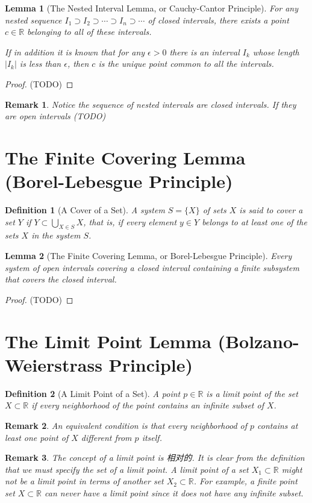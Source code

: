 \documentclass[onecolumn]{ctexart}
\newtheorem{definition}{Definition}
\newtheorem{lemma}{Lemma}
\newtheorem{remark}{Remark}
\begin{document}
\begin{lemma}[The Nested Interval Lemma, or Cauchy-Cantor Principle]
  For any nested sequence $I_1 \supset I_2 \supset \cdots \supset I_n \supset 
  \cdots$ of closed intervals, there exists a point $c \in \mathbb{R}$ belonging 
  to all of these intervals.

  If in addition it is known that for any $\epsilon > 0$ there is an interval 
  $I_k$ whose length $|I_k|$ is less than $\epsilon$, then $c$ is the unique 
  point common to all the intervals.
\end{lemma}
\begin{proof}
  (TODO)
\end{proof}
\begin{remark}
  Notice the sequence of nested intervals are closed intervals. If they are open 
  intervals (TODO)
\end{remark}

\section{The Finite Covering Lemma (Borel-Lebesgue Principle)}

\begin{definition}[A Cover of a Set]
  A system $S = \lbrace X \rbrace$ of sets $X$ is said to cover a set $Y$ if $Y 
  \subset \bigcup_{X \in S} X$, that is, if every element $y \in Y$ belongs to 
  at least one of the sets $X$ in the system $S$.
\end{definition}

\begin{lemma}[The Finite Covering Lemma, or Borel-Lebesgue Principle]
  Every system of open intervals covering a closed interval containing a finite 
  subsystem that covers the closed interval.
\end{lemma}
\begin{proof}
  (TODO)
\end{proof}

\section{The Limit Point Lemma (Bolzano-Weierstrass Principle)}

\begin{definition}[A Limit Point of a Set]
  A point $p \in \mathbb{R}$ is a limit point of the set $X \subset \mathbb{R}$ 
  if every neighborhood of the point contains an infinite subset of $X$.
\end{definition}
\begin{remark}
  An equivalent condition is that every neighborhood of $p$ contains at least 
  one point of $X$ different from $p$ itself.
\end{remark}
\begin{remark}
  The concept of a limit point is 相对的. It is clear from the definition that we 
  must specify the set of a limit point. A limit point of a set $X_1 \subset 
  \mathbb{R}$ might not be a limit point in terms of another set $X_2 \subset 
  \mathbb{R}$. For example, a finite point set $X \subset \mathbb{R}$ can never 
  have a limit point since it does not have any infinite subset.
\end{remark}
\end{document}
